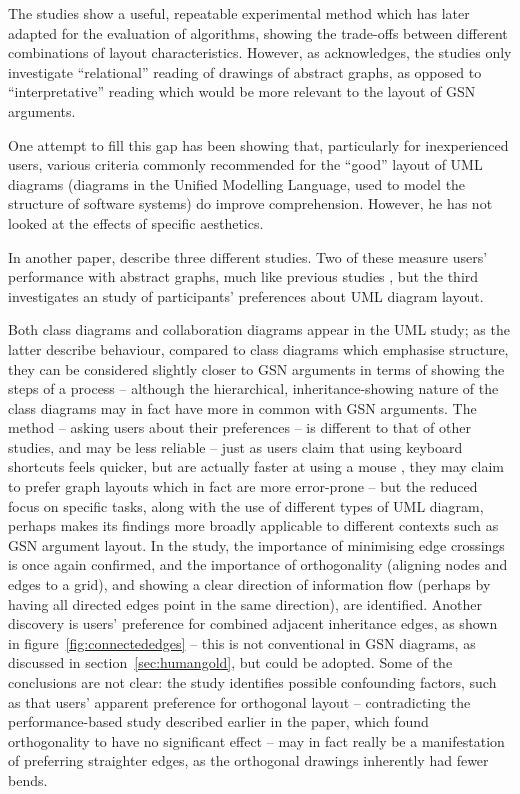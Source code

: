 The studies show a useful, repeatable experimental method which \citet{PURCHASE1998647} has later adapted for the evaluation of algorithms, showing the trade-offs between different combinations of layout characteristics.
However, as \citet{Purchase1997which} acknowledges, the studies only investigate ``relational'' reading of drawings of abstract graphs, as opposed to ``interpretative'' reading which would be more relevant to the layout of GSN arguments.

One attempt to fill this gap has been \citet{storrle} showing that, particularly for inexperienced users, various criteria commonly recommended for the ``good'' layout of UML diagrams (diagrams in the Unified Modelling Language, used to model the structure of software systems) do improve comprehension. However, he has not looked at the effects of specific aesthetics.

In another paper, \citet{Purchase:2002:EEA:594512.594527} describe three different studies. Two of these measure users' performance with abstract graphs, much like previous studies \cite{Purchase1997basis, Purchase1997which, PURCHASE1998647}, but the third investigates an study of participants' preferences about UML diagram layout.

Both class diagrams and collaboration diagrams appear in the UML study; as the latter describe behaviour, compared to class diagrams which emphasise structure, they can be considered slightly closer to GSN arguments in terms of showing the steps of a process -- although the hierarchical, inheritance-showing nature of the class diagrams may in fact have more in common with GSN arguments. The method -- asking users about their preferences -- is different to that of other studies, and may be less reliable -- just as users claim that using keyboard shortcuts feels quicker, but are actually faster at using a mouse \citep[pp.~26]{tognazzini1992tog}, they may claim to prefer graph layouts which in fact are more error-prone -- but the reduced focus on specific tasks, along with the use of different types of UML diagram, perhaps makes its findings more broadly applicable to different contexts such as GSN argument layout. In the study, the importance of minimising edge crossings is once again confirmed, and the importance of orthogonality (aligning nodes and edges to a grid), and showing a clear direction of information flow (perhaps by having all directed edges point in the same direction), are identified. Another discovery is users' preference for combined adjacent inheritance edges, as shown in figure~\ref{fig:connectededges} -- this is not conventional in GSN diagrams, as discussed in section~\ref{sec:humangold}, but could be adopted. Some of the conclusions are not clear: the study identifies possible confounding factors, such as that users' apparent preference for orthogonal layout -- contradicting the performance-based study described earlier in the paper, which found orthogonality to have no significant effect -- may in fact really be a manifestation of preferring straighter edges, as the orthogonal drawings inherently had fewer bends.

